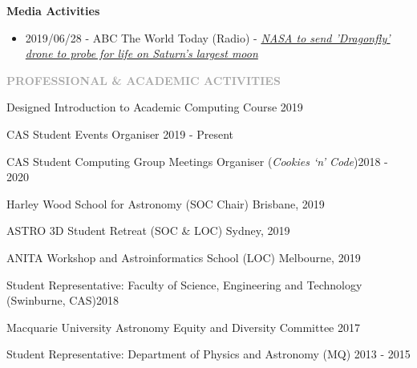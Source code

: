 \documentclass[11pt]{extarticle}
\def\Vhrulefill{{\color{BurntOrange}{\leavevmode\leaders\hrule height 1.2ex depth \dimexpr0.5pt-0.9ex\hfill\kern5pt}}}
\begin{document}
\noindent
\textbf{Media Activities} \par
\begin{itemize}[noitemsep]
\item 2019/06/28 - ABC The World Today (Radio) - \href{https://www.abc.net.au/radio/programs/worldtoday/nasa-dragonfly-drone-to-land-on-saturns-moon-titan-in-2034/11260122}{\emph{NASA to send 'Dragonfly' drone to probe for life on Saturn's largest moon}}
\end{itemize}
\clearpage

\vspace{3ex}
\noindent
\textcolor{darkgray}{\Large\normalfont\bfseries\MakeUppercase{Professional \& Academic Activities}} \Vhrulefill
\vspace{2ex}

\noindent
Designed Introduction to Academic Computing Course \hfill 2019 \par
\noindent
CAS Student Events Organiser \hfill 2019 - Present \par
\noindent
CAS Student Computing Group Meetings Organiser (\emph{Cookies `n' Code})\hfill 2018 - 2020\par
\noindent
Harley Wood School for Astronomy (SOC Chair) \hfill Brisbane, 2019 \par
\noindent
ASTRO 3D Student Retreat (SOC \& LOC) \hfill Sydney, 2019 \par
\noindent
ANITA Workshop and Astroinformatics School (LOC) \hfill Melbourne, 2019 \par
\noindent
Student Representative: Faculty of Science, Engineering and Technology (Swinburne, CAS)\hfill 2018\par
\noindent
Macquarie University Astronomy Equity and Diversity Committee \hfill 2017 \par
\noindent
Student Representative: Department of Physics and Astronomy (MQ) \hfill 2013 - 2015 \par
\end{document}

